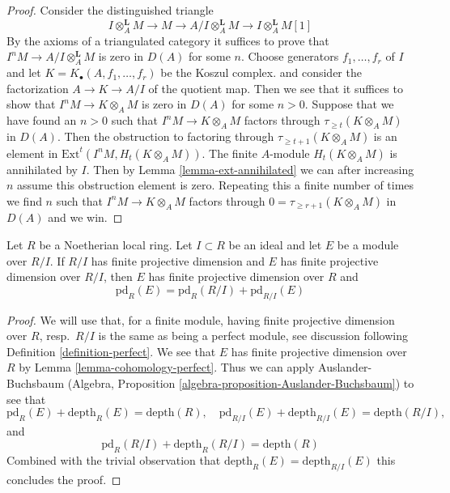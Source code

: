 \begin{proof}
Consider the distinguished triangle
$$
I \otimes_A^\mathbf{L} M \to M \to A/I \otimes_A^\mathbf{L} M \to
I \otimes_A^\mathbf{L} M[1]
$$
By the axioms of a triangulated category it suffices to prove that
$I^nM \to A/I \otimes_A^\mathbf{L} M$ is zero in $D(A)$ for some $n$.
Choose generators $f_1, \ldots, f_r$ of $I$ and let
$K = K_\bullet(A, f_1, \ldots, f_r)$ be the Koszul complex.
and consider the factorization $A \to K \to A/I$ of the quotient map.
Then we see that it suffices to show that $I^nM \to K \otimes_A M$
is zero in $D(A)$ for some $n > 0$. Suppose that we have found an $n > 0$
such that $I^nM \to K \otimes_A M$ factors through
$\tau_{\geq t}(K \otimes_A M)$ in $D(A)$. Then the obstruction
to factoring through $\tau_{\geq t + 1}(K \otimes_A M)$ is an element
in $\text{Ext}^t(I^nM, H_t(K \otimes_A M))$. The finite $A$-module
$H_t(K \otimes_A M)$ is annihilated by $I$. Then by
Lemma \ref{lemma-ext-annihilated}
we can after increasing $n$ assume this obstruction element is zero.
Repeating this a finite number of times we find $n$ such that
$I^nM \to K \otimes_A M$ factors through
$0 = \tau_{\geq r + 1}(K \otimes_A M)$ in $D(A)$ and we win.
\end{proof}

\begin{lemma}
\label{lemma-additivity-of-pd}
Let $R$ be a Noetherian local ring. Let $I \subset R$ be an ideal
and let $E$ be a module over $R/I$. If $R/I$ has finite projective
dimension and $E$ has finite projective dimension over $R/I$, then
$E$ has finite projective dimension over $R$ and
$$
\text{pd}_R(E) = \text{pd}_R(R/I) + \text{pd}_{R/I}(E)
$$
\end{lemma}

\begin{proof}
We will use that, for a finite module, having finite projective dimension
over $R$, resp.\ $R/I$ is the same as being a perfect module, see
discussion following Definition \ref{definition-perfect}.
We see that $E$ has finite projective dimension
over $R$ by Lemma \ref{lemma-cohomology-perfect}.
Thus we can apply Auslander-Buchsbaum (Algebra, Proposition
\ref{algebra-proposition-Auslander-Buchsbaum}) to see that
$$
\text{pd}_R(E) + \text{depth}_R(E) = \text{depth}(R),\quad
\text{pd}_{R/I}(E) + \text{depth}_{R/I}(E) = \text{depth}(R/I),
$$
and
$$
\text{pd}_R(R/I) + \text{depth}_R(R/I) = \text{depth}(R)
$$
Combined with the trivial observation that
$\text{depth}_R(E) = \text{depth}_{R/I}(E)$
this concludes the proof.
\end{proof}





